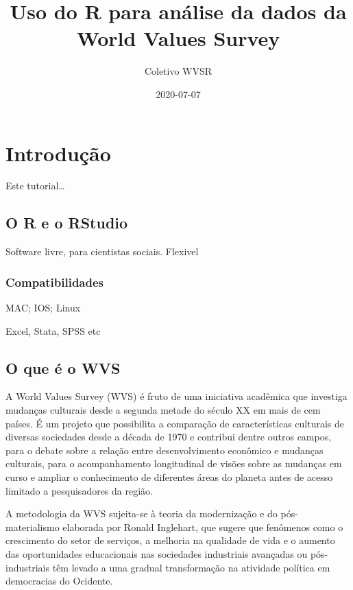 \documentclass[
]{book}
\title{Uso do R para análise da dados da World Values Survey}
\author{Coletivo WVSR}
\date{2020-07-07}
\begin{document}
\maketitle

{
\setcounter{tocdepth}{1}
\tableofcontents
}
\hypertarget{intro}{%
\chapter{Introdução}\label{intro}}

Este tutorial\ldots{}

\hypertarget{o-r-e-o-rstudio}{%
\section{O R e o RStudio}\label{o-r-e-o-rstudio}}

Software livre, para cientistas sociais. Flexivel

\hypertarget{compatibilidades}{%
\subsection{Compatibilidades}\label{compatibilidades}}

MAC; IOS; Linux

Excel, Stata, SPSS etc

\hypertarget{o-que-uxe9-o-wvs}{%
\section{O que é o WVS}\label{o-que-uxe9-o-wvs}}

A World Values Survey (WVS) é fruto de uma iniciativa acadêmica que investiga mudanças culturais desde a segunda metade do século XX em mais de cem países. É um projeto que possibilita a comparação de características culturais de diversas sociedades desde a década de 1970 e contribui dentre outros campos, para o debate sobre a relação entre desenvolvimento econômico e mudanças culturais, para o acompanhamento longitudinal de visões sobre as mudanças em curso e ampliar o conhecimento de diferentes áreas do planeta antes de acesso limitado a pesquisadores da região.

A metodologia da WVS sujeita-se à teoria da modernização e do pós-materialismo elaborada por Ronald Inglehart, que sugere que fenômenos como o crescimento do setor de serviços, a melhoria na qualidade de vida e o aumento das oportunidades educacionais nas sociedades industriais avançadas ou pós-industriais têm levado a uma gradual transformação na atividade política em democracias do Ocidente.
\end{document}
